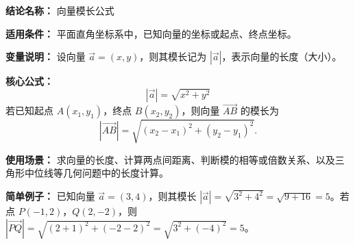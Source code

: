 \textbf{结论名称：} 向量模长公式

\textbf{适用条件：} 平面直角坐标系中，已知向量的坐标或起点、终点坐标。

\textbf{变量说明：} 设向量 $\vec{a}=(x,y)$，则其模长记为 $|\vec{a}|$，表示向量的长度（大小）。

\textbf{核心公式：} 
\[
\boxed{|\vec{a}| = \sqrt{x^{2} + y^{2}}}
\]
若已知起点 $A(x_1,y_1)$，终点 $B(x_2,y_2)$，则向量 $\overrightarrow{AB}$ 的模长为
\[
|\overrightarrow{AB}| = \sqrt{(x_2-x_1)^{2} + (y_2-y_1)^{2}} .
\]

\textbf{使用场景：} 求向量的长度、计算两点间距离、判断模的相等或倍数关系、以及三角形中位线等几何问题中的长度计算。

\textbf{简单例子：} 已知向量 $\vec{a}=(3,4)$，则其模长 $|\vec{a}| = \sqrt{3^{2}+4^{2}} = \sqrt{9+16}=5$。若点 $P(-1,2)$，$Q(2,-2)$，则 $|\overrightarrow{PQ}| = \sqrt{(2+1)^{2}+(-2-2)^{2}} = \sqrt{3^{2}+(-4)^{2}} = 5$。